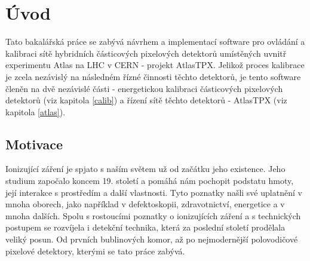

\chapter{Úvod}\label{chap01}
Tato bakalářská práce se zabývá návrhem a implementací software pro ovládání a kalibraci sítě hybridních částicových pixelových detektorů umístěných uvnitř experimentu Atlas na LHC v CERN - projekt AtlasTPX. 
Jelikož proces kalibrace je zcela nezávislý na následném řízné činnosti těchto detektorů, je tento software členěn na dvě nezávislé části - energetickou kalibraci částicových pixelových detektorů (viz kapitola \ref{calib}) a řízení sítě těchto detektorů - AtlasTPX (viz kapitola \ref{atlas}).

\todo

\section{Motivace}
Ionizující záření je spjato s naším světem už od začátku jeho existence. Jeho studium započalo koncem 19. století a pomáhá nám pochopit podstatu hmoty, její interakce s prostředím a další vlastnosti. Tyto poznatky našli své uplatnění v mnoha oborech, jako například v defektoskopii, zdravotnictví, energetice a v mnoha dalších. Spolu s rostoucími poznatky o ionizujících záření a s technických postupem se rozvíjela i detekční technika, která za poslední století prodělala veliký posun. Od prvních bublinových komor, až po nejmodernější polovodičové pixelové detektory, kterými se tato práce zabývá. 


	